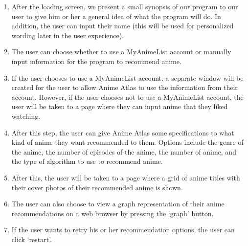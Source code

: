 \documentclass[fontsize=11pt]{article}
\begin{document}
\begin{enumerate}
    \item After the loading screen, we present a small synopsis of our program to our user to give him or her a general idea of what the program will do. In addition, the user can input their name (this will be used for personalized wording later in the user experience).
    \item The user can choose whether to use a MyAnimeList account or manually input information for the program to recommend anime.
    \item If the user chooses to use a MyAnimeList account, a separate window will be created for the user to allow Anime Atlas to use the information from their account. However, if the user chooses not to use a MyAnimeList account, the user will be taken to a page where they can input anime that they liked watching.
    \item After this step, the user can give Anime Atlas some specifications to what kind of anime they want recommended to them. Options include the genre of the anime, the number of episodes of the anime, the number of anime, and the type of algorithm to use to recommend anime. 
    \item After this, the user will be taken to a page where a grid of anime titles with their cover photos of their recommended anime is shown. 
    \item The user can also choose to view a graph representation of their anime recommendations on a web browser by pressing the `graph' button.
    \item If the user wants to retry his or her recommendation options, the user can click ‘restart’. 
\end{enumerate}
\end{document}
